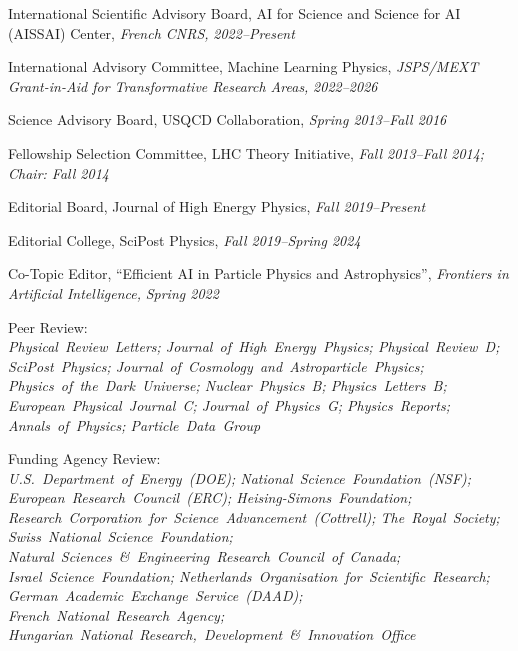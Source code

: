 \item International Scientific Advisory Board, AI for Science and Science for AI (AISSAI) Center, \emph{French CNRS, }\emph{2022--Present}
\item International Advisory Committee, Machine Learning Physics, \emph{JSPS/MEXT Grant-in-Aid for Transformative Research Areas, }\emph{2022--2026}
\item Science Advisory Board, USQCD Collaboration, \emph{Spring 2013--Fall 2016}
\item Fellowship Selection Committee, LHC Theory Initiative, \emph{Fall 2013--Fall 2014; Chair: Fall 2014}
\item Editorial Board, Journal of High Energy Physics, \emph{Fall 2019--Present}
\item Editorial College, SciPost Physics, \emph{Fall 2019--Spring 2024}
\item Co-Topic Editor, ``Efficient AI in Particle Physics and Astrophysics'', \emph{Frontiers in Artificial Intelligence, }\emph{Spring 2022}
\item \raggedright Peer Review: \\ \textit{\nohyphens{Physical~Review~Letters; Journal~of~High~Energy~Physics; Physical~Review~D; SciPost~Physics; Journal~of~Cosmology~and~Astroparticle~Physics; Physics~of~the~Dark~Universe; Nuclear~Physics~B; Physics~Letters~B; European~Physical~Journal~C; Journal~of~Physics~G; Physics~Reports; Annals~of~Physics; Particle~Data~Group}}
\item \raggedright Funding Agency Review: \\ \textit{\nohyphens{U.S.~Department~of~Energy~(DOE); National~Science~Foundation~(NSF); European~Research~Council~(ERC); Heising-Simons~Foundation; Research~Corporation~for~Science~Advancement~(Cottrell); The~Royal~Society; Swiss~National~Science~Foundation; Natural~Sciences~\&~Engineering~Research~Council~of~Canada; Israel~Science~Foundation; Netherlands~Organisation~for~Scientific~Research; German~Academic~Exchange~Service~(DAAD); French~National~Research~Agency; Hungarian~National~Research,~Development~\&~Innovation~Office}}
